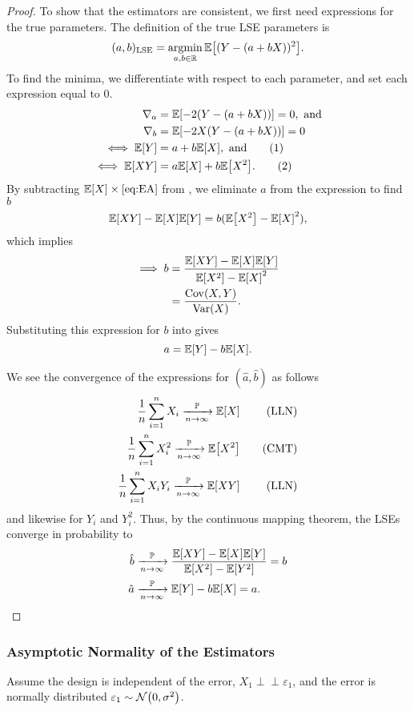 \documentclass[letterpaper, reqno]{amsart}
\numberwithin{equation}{section}
\newcommand{\numberthis}{\addtocounter{equation}{1}\tag{\theequation}}
\newcommand{\E}[1]{\mathbb{E}\mleft[#1\mright]}
\newcommand{\Var}[1]{\operatorname{Var}\mleft(#1\mright)}
\newcommand{\Cov}[1]{\operatorname{Cov}\mleft(#1\mright)}
\newcommand{\R}{\mathbb{R}}  %
\newcommand{\N}[2]{\mathcal{N}\mleft( #1, #2 \mright)}
\newcommand{\indep}{\perp \!\!\! \perp}  %
\newcommand{\sumi}[2]{\sum_{#1=1}^{#2}}
\newcommand{\avg}[2]{\frac{1}{#2}\sumi{#1}{#2}}
\newcommand{\by}[1]{&\quad&\text{(#1)}}
\newcommand{\Plim}{\xrightarrow[n \to \infty]{\mathbb{P}}}
\newcommand{\ve}{\varepsilon}
\DeclareMathOperator*{\argmin}{argmin}
\begin{document}
\begin{proof}
  To show that the estimators are consistent, we first need expressions for the
  true parameters. The definition of the true LSE parameters is
  \[ (a, b)_\mathrm{LSE} = \argmin_{a, b \in \R} \E{(Y - (a + bX))^2}. \]
  To find the minima, we differentiate with respect to each parameter, and set
  each expression equal to 0.
  \begin{align*}
    \nabla_a &= \E{-2(Y - (a + bX))} = 0, \text{ and} \\
    \nabla_b &= \E{-2X(Y - (a + bX))} = 0 \\
    \iff \E{Y} &= a + b\E{X}, \text{ and} \numberthis \label{eq:EA} \\
    \iff \E{XY} &= a\E{X} + b\E{X^2}. \numberthis \label{eq:EB}
  \end{align*}
  By subtracting $\E{X} \times \text{\Cref{eq:EA}}$ from , we
  eliminate $a$ from the expression to find $b$
  \[ \E{XY} - \E{X}\E{Y} = b(\E{X^2} - \E{X}^2), \]
  which implies
  \begin{align*}
    \implies b &= \frac{\E{XY} - \E{X}\E{Y}}{\E{X^2} - \E{X}^2} \\
               &= \frac{\Cov{X, Y}}{\Var{X}}.
  \end{align*}
  Substituting this expression for $b$ into  gives
  \[ a = \E{Y} - b\E{X}. \]

  We see the convergence of the expressions for $(\hat{a}, \hat{b})$ as follows
  \begin{alignat*}{3}
    \avg{i}{n}{X_i} \Plim \E{X} \by{LLN} \\
    \avg{i}{n}{X_i^2} \Plim \E{X^2} \by{CMT} \\
    \avg{i}{n}{X_iY_i} \Plim \E{XY} \by{LLN}
  \end{alignat*}
  and likewise for $Y_i$ and $Y_i^2$. Thus, by the continuous mapping theorem,
  the LSEs converge in probability to
  \begin{align*}
    \hat{b} &\Plim \frac{\E{XY} - \E{X}\E{Y}}{\E{X^2} - \E{Y^2}} = b \\
    \hat{a} &\Plim \E{Y} - b\E{X} = a. \qedhere
  \end{align*}
\end{proof}

\subsubsection{Asymptotic Normality of the Estimators} \label{sec:2dnormal}
Assume the design is independent of the error, $X_1 \indep \ve_1$, and the error
is normally distributed $\ve_1 \sim \N{0}{\sigma^2}$.
\end{document}
